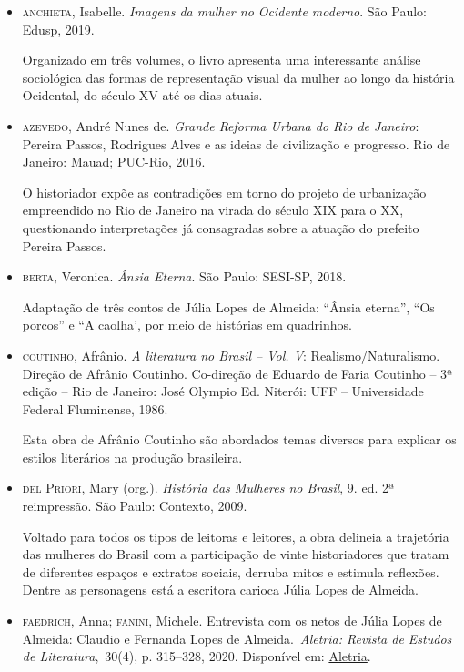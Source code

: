 \documentclass[12pt]{extarticle}
\begin{document}
\begin{itemize}
\item\textsc{anchieta}, Isabelle. \emph{Imagens da mulher no Ocidente moderno}. São
Paulo: Edusp, 2019. 

Organizado em três volumes, o livro apresenta uma
interessante análise sociológica das formas de representação visual da
mulher ao longo da história Ocidental, do século XV até os dias
atuais.

\item\textsc{azevedo}, André Nunes de. \emph{Grande Reforma Urbana do Rio de
Janeiro}: Pereira Passos, Rodrigues Alves e as ideias de civilização e
progresso. Rio de Janeiro: Mauad; PUC-Rio, 2016. 

O historiador expõe as contradições em torno do projeto de urbanização empreendido 
no Rio de Janeiro na virada do século \textsc{\textsc{XIX}} para o \textsc{\textsc{XX}}, questionando
interpretações já consagradas sobre a atuação do prefeito Pereira
Passos.

\item\textsc{berta}, Veronica. \textit{Ânsia Eterna}. São Paulo: SESI-SP,
2018.

Adaptação de três contos de Júlia Lopes de Almeida: ``Ânsia eterna'', 
``Os porcos'' e ``A caolha', por meio de histórias em quadrinhos.

\item\textsc{coutinho}, Afrânio. \textit{A literatura no Brasil -- Vol. V}:
Realismo/Naturalismo. Direção de Afrânio Coutinho. Co-direção de 
Eduardo de Faria Coutinho -- 3ª edição -- Rio de Janeiro: José Olympio
Ed. Niterói: UFF -- Universidade Federal Fluminense, 1986.

Esta obra de Afrânio Coutinho são abordados temas diversos para explicar 
os estilos literários na produção brasileira.

\item\textsc{del Priori}, Mary (org.). \emph{História das Mulheres no Brasil}, 9.
ed. 2ª reimpressão. São Paulo: Contexto, 2009. 

Voltado para todos os tipos de leitoras e leitores, a obra delineia a trajetória das
mulheres do Brasil com a participação de vinte historiadores que
tratam de diferentes espaços e extratos sociais, derruba mitos e
estimula reflexões. Dentre as personagens está a escritora carioca
Júlia Lopes de Almeida.

\item\textsc {faedrich}, Anna; \textsc{fanini}, Michele. Entrevista com os netos de Júlia
Lopes de Almeida: Claudio e Fernanda Lopes de Almeida.~\emph{Aletria:
Revista de Estudos de Literatura},~30(4), p. 315--328, 2020.
Disponível em: \href{https://doi.org/10.35699/2317-2096.2020.24495}{Aletria}.


\end{itemize}
\end{document}
